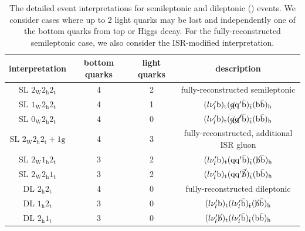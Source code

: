 \begin{table}[h!]

\begin{center}
\caption{The detailed event interpretations for semileptonic and dileptonic \ttH (\ttbb) events. We consider cases where up to 2 light quarks may be lost and independently one of the bottom quarks from top or Higgs decay. For the fully-reconstructed semileptonic case, we also consider the ISR-modified interpretation.}
\label{tab:event_interpretation_list}
\begin{tabular}{c|ccc}
\hline
interpretation & bottom quarks & light quarks & description \\
\hline
SL $2_{\mathrm{W}} 2_{\mathrm{h}} 2_{\mathrm{t}}$ & 4 & 2 & fully-reconstructed semileptonic \\
SL $1_{\mathrm{W}} 2_{\mathrm{h}} 2_{\mathrm{t}}$ & 4 & 1 & $(l \nu_{l}' \mathrm{b})_{\mathrm{t}} (\cancel{\mathrm{q}} \mathrm{q}' \bar{\mathrm{b}})_{\bar{\mathrm{t}}} (\mathrm{b} \bar{\mathrm{b}})_{\mathrm{h}}$ \\
SL $0_{\mathrm{W}} 2_{\mathrm{h}} 2_{\mathrm{t}}$ & 4 & 0 & $(l \nu_{l}' \mathrm{b})_{\mathrm{t}} (\cancel{\mathrm{q}} \cancel{\mathrm{q}'} \bar{\mathrm{b}})_{\bar{\mathrm{t}}} (\mathrm{b} \bar{\mathrm{b}})_{\mathrm{h}}$ \\
SL $2_{\mathrm{W}} 2_{\mathrm{h}} 2_{\mathrm{t}}+1\mathrm{g}$ & 4 & 3 & fully-reconstructed, additional ISR gluon \\
SL $2_{\mathrm{W}} 1_{\mathrm{h}} 2_{\mathrm{t}}$ & 3 & 2 & $(l \nu_{l}' \mathrm{b})_{\mathrm{t}} (\mathrm{q} \mathrm{q}' \bar{\mathrm{b}})_{\bar{\mathrm{t}}} (\cancel{\mathrm{b}} \bar{\mathrm{b}})_{\mathrm{h}}$ \\
SL $2_{\mathrm{W}} 2_{\mathrm{h}} 1_{\mathrm{t}}$ & 3 & 2 & $(l \nu_{l}' \mathrm{b})_{\mathrm{t}} (\mathrm{q} \mathrm{q}' \cancel{\bar{\mathrm{b}}})_{\bar{\mathrm{t}}} (\mathrm{b} \bar{\mathrm{b}})_{\mathrm{h}}$ \\
\hline
DL $2_{\mathrm{h}} 2_{\mathrm{t}}$ & 4 & 0 & fully-reconstructed dileptonic \\
DL $1_{\mathrm{h}} 2_{\mathrm{t}}$ & 3 & 0 & $(l \nu_{l}' \mathrm{b})_{\mathrm{t}} (l \nu_{l}' \bar{\mathrm{b}})_{\bar{\mathrm{t}}} (\cancel{\mathrm{b}} \bar{\mathrm{b}})_{\mathrm{h}}$ \\
DL $2_{\mathrm{h}} 1_{\mathrm{t}}$ & 3 & 0 & $(l \nu_{l}' \cancel{\mathrm{b}})_{\mathrm{t}} (l \nu_{l}' \bar{\mathrm{b}})_{\bar{\mathrm{t}}} (\mathrm{b} \bar{\mathrm{b}})_{\mathrm{h}}$ \\
\hline
\hline
\end{tabular}
\end{center}
\end{table}

